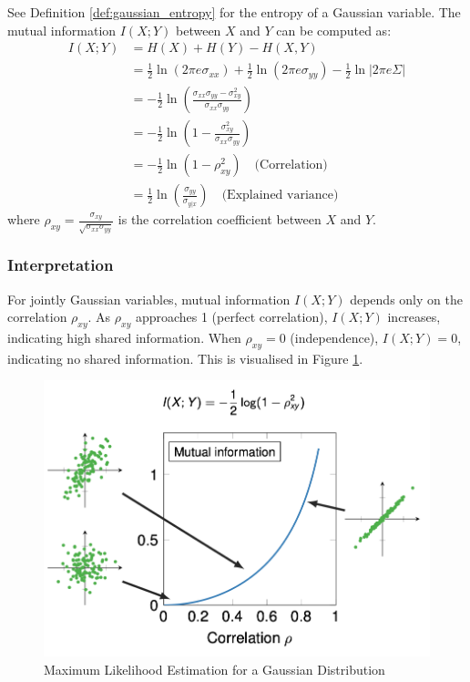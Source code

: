 See Definition \ref{def:gaussian_entropy} for the entropy of a Gaussian variable. The mutual information \( I(X; Y) \) between \( X \) and \( Y \) can be computed as:
\begin{align*}
    I(X; Y) & = H(X) + H(Y) - H(X, Y)                                                                                            \\
            & = \frac{1}{2} \ln (2 \pi e \sigma_{xx}) + \frac{1}{2} \ln (2 \pi e \sigma_{yy}) - \frac{1}{2} \ln |2 \pi e \Sigma| \\
            & = -\frac{1}{2} \ln \left( \frac{\sigma_{xx} \sigma_{yy} - \sigma_{xy}^2}{\sigma_{xx} \sigma_{yy}} \right)          \\
            & = -\frac{1}{2} \ln \left( 1 - \frac{\sigma_{xy}^2}{\sigma_{xx} \sigma_{yy}} \right)                                \\
            & = -\frac{1}{2} \ln (1 - \rho_{xy}^2) \quad \text{(Correlation)}                                                          \\
            & = \frac{1}{2} \ln \left( \frac{\sigma_{yy}}{\sigma_{y|x}} \right)\quad  \text{(Explained variance)}
\end{align*}
where \( \rho_{xy} = \frac{\sigma_{xy}}{\sqrt{\sigma_{xx} \sigma_{yy}}} \) is the correlation coefficient between \( X \) and \( Y \).

\pagebreak
\subsubsection{Interpretation}
For jointly Gaussian variables, mutual information \( I(X; Y) \) depends only on the correlation \( \rho_{xy} \). As \( \rho_{xy} \) approaches 1 (perfect correlation), \( I(X; Y) \) increases, indicating high shared information. When \( \rho_{xy} = 0 \) (independence), \( I(X; Y) = 0 \), indicating no shared information. This is visualised in Figure \ref{fig:ml_gauss}.



\begin{figure}[h]
    \centering
    \includegraphics[width=1\linewidth]{img/ml_gauss.png}
    \caption{Maximum Likelihood Estimation for a Gaussian Distribution}
    \label{fig:ml_gauss}
\end{figure}



